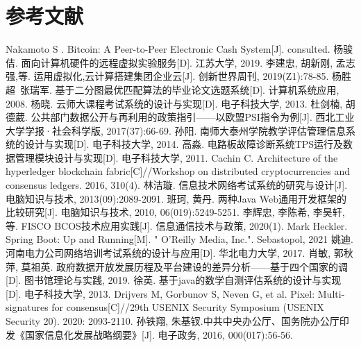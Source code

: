 \section*{参考文献}

\begingroup
\def\section*#1{}

\begin{thebibliography}{99}

\songti{}

Nakamoto S . Bitcoin: A Peer-to-Peer Electronic Cash System[J]. consulted.
杨骏佶. 面向计算机硬件的远程虚拟实验服务[D]. 江苏大学, 2019.
李建忠, 胡新刚, 孟志强,等. 运用虚拟化,云计算搭建集团企业云[J]. 创新世界周刊, 2019(Z1):78-85.
杨胜超~张瑞军. 基于二分图最优匹配算法的毕业论文选题系统[D]. 计算机系统应用, 2008.
杨晓. 云师大课程考试系统的设计与实现[D]. 电子科技大学, 2013.
杜剑楠, 胡德葳. 公共部门数据公开与再利用的政策指引——以欧盟PSI指令为例[J]. 西北工业大学学报·社会科学版, 2017(37):66-69.
孙阳. 南师大泰州学院教学评估管理信息系统的设计与实现[D]. 电子科技大学, 2014.
高淼. 电路板故障诊断系统TPS运行及数据管理模块设计与实现[D]. 电子科技大学, 2011.
Cachin C. Architecture of the hyperledger blockchain fabric[C]//Workshop on distributed cryptocurrencies and consensus ledgers. 2016, 310(4).
林洁璇. 信息技术网络考试系统的研究与设计[J]. 电脑知识与技术, 2013(09):2089-2091.
班珂, 黄丹. 两种Java Web通用开发框架的比较研究[J]. 电脑知识与技术, 2010, 06(019):5249-5251.
李辉忠, 李陈希, 李昊轩,等. FISCO BCOS技术应用实践[J]. 信息通信技术与政策, 2020(1).
Mark Heckler. Spring Boot: Up and Running[M]. " O'Reilly Media, Inc.". Sebastopol, 2021
姚迪. 河南电力公司网络培训考试系统的设计与应用[D]. 华北电力大学, 2017.
肖敏, 郭秋萍, 莫祖英. 政府数据开放发展历程及平台建设的差异分析——基于四个国家的调[D]. 图书馆理论与实践, 2019.
徐英. 基于java的数学自测评估系统的设计与实现[D]. 电子科技大学, 2013.
Drijvers M, Gorbunov S, Neven G, et al. Pixel: Multi-signatures for consensus[C]//29th {USENIX} Security Symposium ({USENIX} Security 20). 2020: 2093-2110.
孙铁翔, 朱基钗.中共中央办公厅、国务院办公厅印发《国家信息化发展战略纲要》[J]. 电子政务, 2016, 000(017):56-56.

\end{thebibliography}
